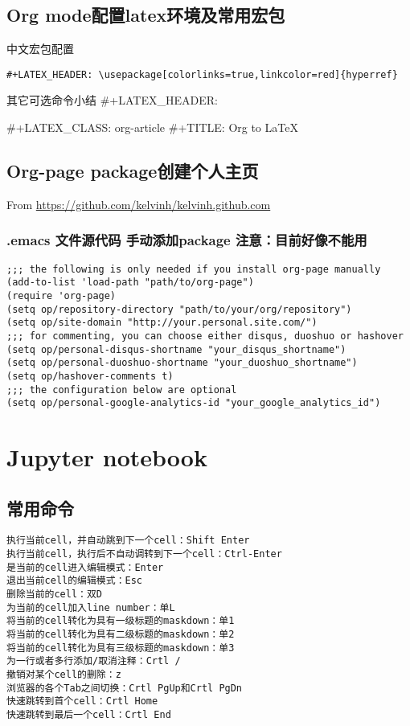 \documentclass[11pt]{article}
\begin{document}
\subsection{Org mode配置latex环境及常用宏包}
\label{sec:org0d0f622}
中文宏包配置
\begin{verbatim}
#+LATEX_HEADER: \usepackage[colorlinks=true,linkcolor=red]{hyperref}
\end{verbatim}
其它可选命令小结
#+LATEX_HEADER: \usepackage[colorlinks=true,linkcolor=red]{hyperref}
#+LATEX_CLASS: org-article
#+TITLE: Org to \LaTeX
\subsection{Org-page package创建个人主页}
\label{sec:orge0b357c}
From \url{https://github.com/kelvinh/kelvinh.github.com}
\subsubsection{.emacs 文件源代码 手动添加package 注意：目前好像不能用}
\label{sec:org1a21e00}
\begin{verbatim}
;;; the following is only needed if you install org-page manually
(add-to-list 'load-path "path/to/org-page")
(require 'org-page)
(setq op/repository-directory "path/to/your/org/repository")
(setq op/site-domain "http://your.personal.site.com/")
;;; for commenting, you can choose either disqus, duoshuo or hashover
(setq op/personal-disqus-shortname "your_disqus_shortname")
(setq op/personal-duoshuo-shortname "your_duoshuo_shortname")
(setq op/hashover-comments t)
;;; the configuration below are optional
(setq op/personal-google-analytics-id "your_google_analytics_id")
\end{verbatim}
\section{Jupyter notebook}
\label{sec:org54dc93b}
\subsection{常用命令}
\label{sec:org20196fa}
\begin{verbatim}
执行当前cell，并自动跳到下一个cell：Shift Enter
执行当前cell，执行后不自动调转到下一个cell：Ctrl-Enter
是当前的cell进入编辑模式：Enter
退出当前cell的编辑模式：Esc
删除当前的cell：双D
为当前的cell加入line number：单L
将当前的cell转化为具有一级标题的maskdown：单1
将当前的cell转化为具有二级标题的maskdown：单2
将当前的cell转化为具有三级标题的maskdown：单3
为一行或者多行添加/取消注释：Crtl /
撤销对某个cell的删除：z
浏览器的各个Tab之间切换：Crtl PgUp和Crtl PgDn
快速跳转到首个cell：Crtl Home
快速跳转到最后一个cell：Crtl End
\end{verbatim}
\end{document}
